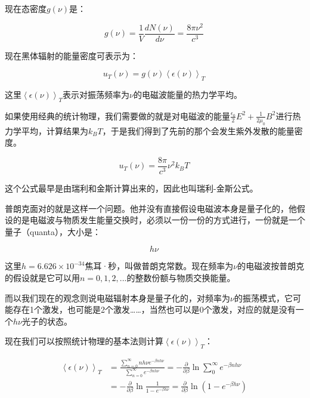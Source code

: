 现在态密度$g (\nu)$是：

\begin{equation}
g(\nu) = \frac{1}{V} \frac{d N (\nu)}{d \nu} = \frac{8 \pi \nu^2 }{ c^3 }~
\end{equation}

现在黑体辐射的能量密度可表示为：

\begin{equation}
u_T (\nu) = g (\nu) \left\langle \epsilon (\nu)  \right\rangle_T~
\end{equation}

这里$\left\langle \epsilon (\nu)  \right\rangle_T$表示对振荡频率为$\nu$的电磁波能量的热力学平均。

如果使用经典的统计物理，我们需要做的就是对电磁波的能量$ \frac{\epsilon_0}{2} E^2 + \frac{1}{2 \mu_0} B^2 $进行热力学平均，计算结果为$k_B T$，于是我们得到了先前的那个会发生紫外发散的能量密度。

\begin{equation}
u_T(\nu) = \frac{ 8 \pi }{ c^3 } \nu^2 k_B T~
\end{equation}

这个公式最早是由瑞利和金斯计算出来的，因此也叫瑞利-金斯公式。

普朗克面对的就是这样一个问题。他并没有直接假设电磁波本身是量子化的，他假设的是电磁波与物质发生能量交换时，必须以一份一份的方式进行，一份就是一个量子（quanta），大小是：

\begin{equation}
h \nu~
\end{equation}

这里$h = 6.626 \times 10^{-34 }$焦耳·秒，叫做普朗克常数。现在频率为$\nu$的电磁波按普朗克的假设就是它可以用$n = 0 , 1, 2, ...$的整数份额与物质交换能量。

而以我们现在的观念则说电磁辐射本身是量子化的，对频率为$\nu$的振荡模式，它可能存在1个激发，也可能是2个激发……，当然也可以是0个激发，对应的就是没有一个$h \nu$光子的状态。

现在我们可以按照统计物理的基本法则计算$\left\langle \epsilon (\nu)  \right\rangle_T$：

\begin{align}
\left\langle \epsilon (\nu)  \right\rangle_T &= \frac{ \sum\limits_{n=0}^{\infty} n h \nu e^{- \beta n h \nu } }{ \sum\limits_{n=0}^{\infty} e^{- \beta n h \nu  } } =  - \frac{\partial }{\partial \beta } \ln \sum\limits_0^{\infty} e^{-\beta n h \nu } \\
{} &= - \frac{\partial }{\partial \beta } \ln \frac{1}{ 1- e^{- \beta h \nu} } = \frac{\partial }{\partial \beta} \ln \left( 1 - e^{- \beta h \nu} \right)~
\end{align}

